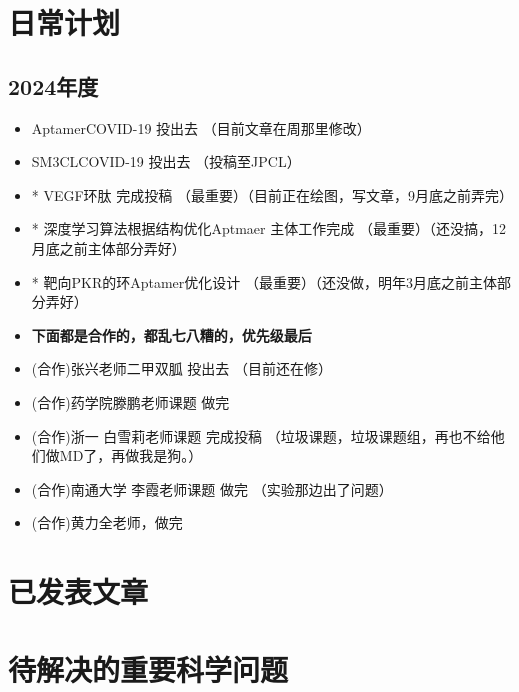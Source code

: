 \chapter{日常计划}
\section{2024年度}
\begin{itemize}
    \item AptamerCOVID-19 投出去 （目前文章在周那里修改）
    \item SM3CLCOVID-19 投出去 （投稿至JPCL）
    \item * VEGF环肽 完成投稿 （最重要）（目前正在绘图，写文章，9月底之前弄完）
    \item * 深度学习算法根据结构优化Aptmaer 主体工作完成 （最重要）（还没搞，12月底之前主体部分弄好）
    \item * 靶向PKR的环Aptamer优化设计 （最重要）（还没做，明年3月底之前主体部分弄好）
    \item \textbf{下面都是合作的，都乱七八糟的，优先级最后}
    \item (合作)张兴老师二甲双胍 投出去 （目前还在修）
    \item (合作)药学院滕鹏老师课题 做完
    \item (合作)浙一 白雪莉老师课题 完成投稿 （垃圾课题，垃圾课题组，再也不给他们做MD了，再做我是狗。）
    \item (合作)南通大学 李霞老师课题 做完 （实验那边出了问题）
    \item (合作)黄力全老师，做完
\end{itemize}
\chapter{已发表文章}
\chapter{待解决的重要科学问题}
